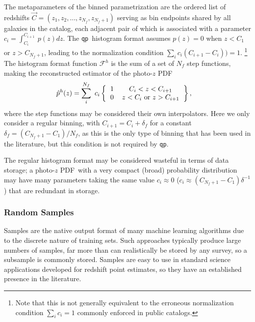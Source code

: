 \documentclass[\docopts]{\docclass}
\newcommand{\qp}{\texttt{qp}}
\newcommand{\pz}{photo-$z$ PDF}
\begin{document}
The metaparameters of the binned parametrization are the ordered list of 
redshifts $\vec{C} = (z_{1}, z_{2}, \dots, z_{N_{f}}, z_{N_{f}+1})$ serving as 
bin endpoints shared by all galaxies in the catalog, each adjacent pair of 
which is associated with a parameter $c_{i}=\int_{C_{i}}^{C_{i+1}}\ p(z)dz$.
The \qp\ histogram format assumes $p(z)=0$ when $z<C_{1}$ or $z>C_{N_{f}+1}$, 
leading to the normalization condition $\sum_{i} c_{i}(C_{i+1}-C_{i})) = 1$.
\footnote{Note that this is not generally equivalent to the erroneous 
normalization condition $\sum_{i} c_{i} = 1$ commonly enforced in public 
catalogs.}
The histogram format function $\mathcal{F}^{h}$ is the sum of a set of $N_{f}$ 
step functions, making the reconstructed estimator of the \pz
\begin{align}
  \label{eq:binned}
  \hat{p}^{h}(z) &= \sum_{i}^{N_{f}}\ c_{i} 
\left\{\begin{tabular}{cc}$1$&$C_{i}<z<C_{i+1}$\\
0&$z < C_{i}$\ or\ $z > C_{i+1}$\end{tabular}\right\},
\end{align}
where the step functions may be considered their own interpolators.
Here we only consider a regular binning, with $C_{i+1}=C_{i}+\delta_{f}$ for a 
constant $\delta_{f}=(C_{N_{f}+1}-C_{1})/N_{f}$, as this is the only type of 
binning that has been used in the literature, but this condition is not 
required by \qp.

The regular histogram format may be considered wasteful in terms of data 
storage; a \pz\ with a very compact (broad) probability distribution may have 
many parameters taking the same value $c_{i}\approx0$ 
($c_{i}\approx(C_{N_{f}+1}-C_{1})\delta^{-1}$) that are redundant in storage.

\subsubsection{Random Samples}
\label{sec:samples}

Samples are the native output format of many machine learning algorithms due to 
the discrete nature of training sets.  \citep{de_vicente_dnf_2016}
Such approaches typically produce large numbers of samples, far more than can 
realistically be stored by any survey, so a subsample is commonly stored.
Samples are easy to use in standard science applications developed for redshift 
point estimates, so they have an established presence in the literature.
\end{document}

